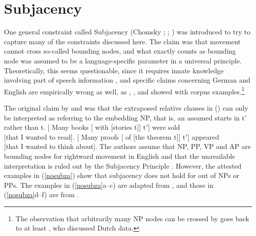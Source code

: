 \documentclass[output=paper,biblatex,babelshorthands,newtxmath,draftmode,colorlinks,citecolor=brown]{langscibook}
\begin{document}
\section{Subjacency}

One general constraint called Subjacency (Chomsky \citeyear[]{Chomsky73a}; \citeyear[]{Chomsky86b};
\citealp{Baltin81a,Baltin2006a}) was introduced to try to capture many of the constraints discussed here.
The claim was that movement cannot cross so-called bounding nodes, and what exactly counts as bounding
node was assumed to be a language-specific parameter in a universal principle. Theoretically, this
seems questionable, since it requires innate knowledge involving part of speech information
\parencites[Section~13.1.5.1]{MuellerGT-Eng4}[--540]{Newmeyer2004a}, and specific claims
concerning German and English are empirically wrong as well, as \citet{Mueller2004d},
\citet{Mueller2007c}, \citet{MM2009a} and \citet{SS2013b-u} showed with corpus examples.\footnote{
  The observation that arbitrarily many NP nodes can be crossed by  goes back
  to at least \citet[]{Koster78b-u}, who discussed Dutch data.
}

The original claim by \citet{Baltin81a} and \citet[]{Chomsky86b} was that the extraposed
relative clauses in () can only be interpreted as referring to the embedding NP, that is, an
assumed  starts in t$'$ rather than t.
\eal
\label{ex-chomsky-sub}
\ex {}[ Many books [ with [stories t]] t$'$]  were sold\\
    {}[that I wanted to read].
\ex {}[ Many proofs [ of [the theorem t]] t$'$] appeared\\
    {}[that I wanted to think about].
\zl
The authors assume that NP, PP, VP and AP are bounding nodes for rightward movement in English and
that the unavailable interpretation is ruled out by the Subjacency Principle \citep[]{Baltin81a}. However, the attested examples in (\ref{nosubza}) show that subjacency does not
hold for  out of NPs or PPs. The examples in (\ref{nosubza}a--c) are adapted from
\citet[, 109, 111]{SS2013b-u}, and those in (\ref{nosubza}d--f) are from \citet[863]{chavesrnr}.
\eal \label{nosubza}

\end{document}
